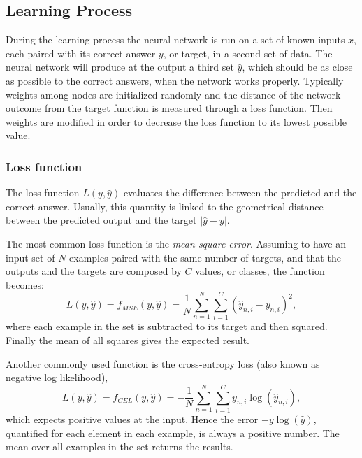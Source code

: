 \subsection{Learning Process}
\label{ssec:Learning_Process}
During the learning process the neural network is run on a set of known inputs $x$, each paired with its correct answer $y$, or target, in a second set of data.
The neural network will produce at the output a third set $\hat{y}$, which should be as close as possible to the correct answers, when the network works properly.
Typically weights among nodes are initialized randomly and the distance of the network outcome from the target function is measured through a loss function.
Then weights are modified in order to decrease the loss function to its lowest possible value. %

\subsubsection{Loss function}
\label{sssec:Loss_function}
The loss function $L(y, \hat{y})$ evaluates the difference between the predicted and the correct answer.
Usually, this quantity is linked to the geometrical distance between the predicted output and the target $\left| \hat{y}-y \right|$.

The most common loss function is the \textit{mean-square error}.
Assuming to have an input set of $N$ examples paired with the same number of targets, and that the outputs and the targets are composed by $C$ values, or classes, the function becomes:
\begin{equation}
	L(y, \hat{y}) = f_{MSE}(y, \hat{y}) = \frac{1}{N} \sum_{n=1}^N \sum_{i=1}^C \left( \hat{y}_{n,i} - y_{n,i} \right)^2,
\end{equation}
where each example in the set is subtracted to its target and then squared.
Finally the mean of all squares gives the expected result.

Another commonly used function is the cross-entropy loss (also known as negative log likelihood),
\begin{equation}
	L(y, \hat{y}) = f_{CEL}(y, \hat{y}) = - \frac{1}{N} \sum_{n=1}^N \sum_{i=1}^C y_{n,i} \log \left( \hat{y}_{n,i} \right),
\end{equation}
which expects positive values at the input.
Hence the error $-y\log \left( \hat{y} \right)$, quantified for each element in each example, is always a positive number.
The mean over all examples in the set returns the results.

